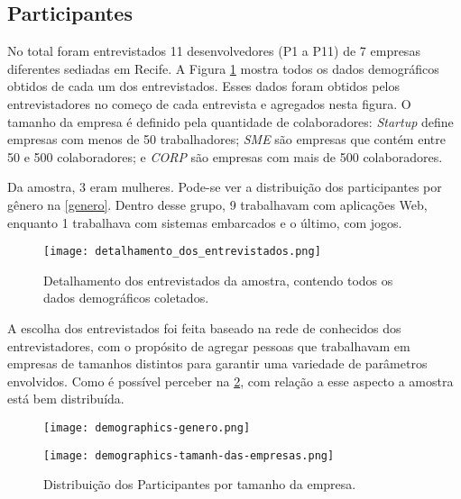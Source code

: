 \subsection{Participantes}

No total foram entrevistados 11 desenvolvedores (P1 a P11) de 7 empresas diferentes sediadas em Recife. A Figura \ref{detalhamento_dos_entrevistados} mostra todos os dados demográficos obtidos de cada um dos entrevistados. Esses dados foram obtidos pelos entrevistadores no começo de cada entrevista e agregados nesta figura. O tamanho da empresa é definido pela quantidade de colaboradores: \emph{Startup} define empresas com menos de 50 trabalhadores; \emph{SME} são empresas que contém entre 50 e 500 colaboradores; e \emph{CORP} são empresas com mais de 500 colaboradores.


Da amostra, 3 eram mulheres. Pode-se ver a distribuição dos participantes por gênero na \ref{genero}. Dentro desse grupo, 9 trabalhavam com aplicações Web, enquanto 1 trabalhava com sistemas embarcados e o último, com jogos.

\begin{figure}[h]
\centering
\texttt{[image: detalhamento\_dos\_entrevistados.png]}
\caption{Detalhamento dos entrevistados da amostra, contendo todos os dados demográficos coletados.}
\label{detalhamento_dos_entrevistados}
\end{figure}


A escolha dos entrevistados foi feita baseado na rede de conhecidos dos entrevistadores, com o propósito de agregar pessoas que trabalhavam em empresas de tamanhos distintos para garantir uma variedade de parâmetros envolvidos. Como é possível perceber na \ref{tamanho_empresa}, com relação a esse aspecto a amostra está bem distribuída. 

\begin{figure}
\centering
\begin{minipage}{.48\textwidth}
    \centering
    \texttt{[image: demographics-genero.png]}
    \caption[Distribuição dos Participantes por gênero]{
    Distribuição dos Participantes por gênero
    }
    \label{genero}
\end{minipage}%
\hfill
\begin{minipage}{.48\textwidth}
    \centering
    \texttt{[image: demographics-tamanh-das-empresas.png]}
    \caption[Distribuição dos Participantes por tamanho da empresa]{
    Distribuição dos Participantes por tamanho da empresa.
    }
    \label{tamanho_empresa}
\end{minipage}
\end{figure}

